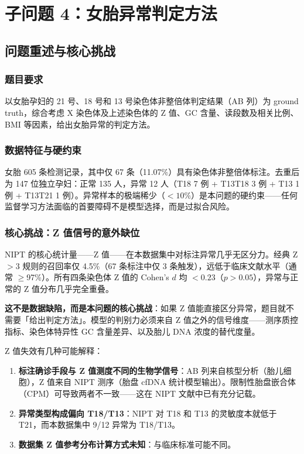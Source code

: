 \documentclass{mcm-paper}
\begin{document}
\section{子问题 4：女胎异常判定方法}

\subsection{问题重述与核心挑战}

\subsubsection{题目要求}

以女胎孕妇的 21 号、18 号和 13 号染色体非整倍体判定结果（AB 列）为 ground truth，综合考虑 X 染色体及上述染色体的 Z 值、GC 含量、读段数及相关比例、BMI 等因素，给出女胎异常的判定方法。

\subsubsection{数据特征与硬约束}

女胎 605 条检测记录，其中仅 67 条（11.07\%）具有染色体非整倍体标注。去重后为 147 位独立孕妇：正常 135 人，异常 12 人（T18 7 例 + T13T18 3 例 + T13 1 例 + T13T21 1 例）。异常样本的极端稀少（$<10\%$）是本问题的硬约束——任何监督学习方法面临的首要障碍不是模型选择，而是过拟合风险。

\subsubsection{核心挑战：Z 值信号的意外缺位}

NIPT 的核心统计量——Z 值——在本数据集中对标注异常几乎无区分力。经典 Z$>3$ 规则的召回率仅 4.5\%（67 条标注中仅 3 条触发），远低于临床文献水平（通常 $\geq$97\%）。所有四条染色体 Z 值的 Cohen's $d$ 均 $<0.23$（$p>0.05$），异常与正常的 Z 值分布几乎完全重叠。

\textbf{这不是数据缺陷，而是本问题的核心挑战}：如果 Z 值能直接区分异常，题目就不需要「给出判定方法」。模型的判别力必须来自 Z 值之外的信号维度——测序质控指标、染色体特异性 GC 含量差异、以及胎儿 DNA 浓度的替代度量。

Z 值失效有几种可能解释：
\begin{enumerate}
    \item \textbf{标注确诊手段与 Z 值测度不同的生物学信号}：AB 列来自核型分析（胎儿细胞），Z 值来自 NIPT 测序（胎盘 cfDNA 统计模型输出）。限制性胎盘嵌合体（CPM）可导致两者不一致——这在 NIPT 文献中已有充分记载\cite{grati2014}。
    \item \textbf{异常类型构成偏向 T18/T13}：NIPT 对 T18 和 T13 的灵敏度本就低于 T21，而本数据集中 9/12 异常为 T18/T13。
    \item \textbf{数据集 Z 值参考分布计算方式未知}：与临床标准可能不同。
\end{enumerate}
\end{document}
